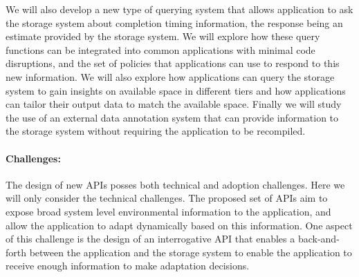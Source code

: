 We will also develop a new type of querying system that allows application
to ask the storage system about completion timing information, the response
being an estimate provided by the storage system. We will explore how these
query functions can be integrated into common applications with minimal code
disruptions, and the set of policies that applications can use to respond to
this new information. We will also explore how applications can query the
storage system to gain insights on available space in different tiers and
how applications can tailor their output data to match the available space. 
Finally we will study the use of an external data annotation system that can
provide information to the storage system without requiring the application
to be recompiled. 

\paragraph{Challenges:}
The design of new APIs posses both technical and adoption challenges. Here
we will only consider the technical challenges. The proposed set of APIs aim
to expose broad system level environmental information to the application,
and allow the application to adapt dynamically based on this information.
One aspect of this challenge is the design of an interrogative API that
enables a back-and-forth between the application and the storage system to
enable the application to receive enough information to make adaptation
decisions. 


